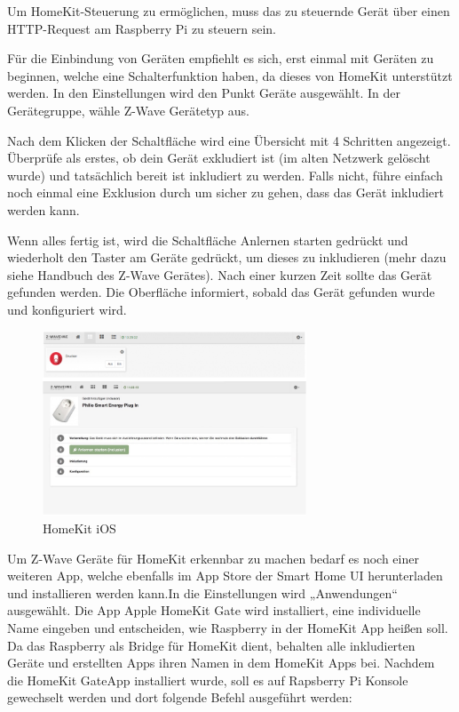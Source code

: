 Um HomeKit-Steuerung zu ermöglichen, muss das zu steuernde Gerät über einen HTTP-Request am Raspberry Pi zu steuern sein.

Für die Einbindung von Geräten empfiehlt es sich, erst einmal mit Geräten zu beginnen, welche eine Schalterfunktion haben, da dieses von HomeKit unterstützt werden. In den Einstellungen wird den Punkt \glqq Geräte\grqq{} ausgewählt. In der Gerätegruppe, wähle Z-Wave Gerätetyp aus.

Nach dem Klicken der Schaltfläche wird eine Übersicht mit 4 Schritten angezeigt. Überprüfe als
erstes, ob dein Gerät exkludiert ist (im alten Netzwerk gelöscht wurde) und tatsächlich bereit ist inkludiert zu werden. Falls nicht, führe einfach noch einmal eine Exklusion durch um sicher zu gehen, dass das Gerät inkludiert werden kann.

Wenn alles fertig ist, wird die Schaltfläche \glqq Anlernen starten\grqq{} gedrückt und wiederholt den Taster am Geräte gedrückt, um dieses zu inkludieren (mehr dazu siehe Handbuch des Z-Wave Gerätes). Nach einer kurzen Zeit sollte das Gerät gefunden werden. Die Oberfläche informiert, sobald das Gerät gefunden wurde und konfiguriert wird.

\begin{figure}[h!]
	\centering
	\includegraphics[width=0.7\textwidth]{img/Feedback-Mechanismen/HomeKit.png}
	\caption{HomeKit iOS}
	\label{fig:feedbackHomeKit}
\end{figure}

Um Z-Wave Geräte für HomeKit erkennbar zu machen bedarf es noch einer weiteren App, welche ebenfalls im App Store der Smart Home UI herunterladen und installieren werden kann.In die Einstellungen wird „Anwendungen“ ausgewählt. Die \glqq App Apple HomeKit Gate\grqq{} wird installiert, eine individuelle Name eingeben und entscheiden, wie Raspberry in der HomeKit App heißen soll. Da das Raspberry als Bridge für HomeKit dient, behalten alle inkludierten Geräte und erstellten Apps ihren Namen in dem HomeKit Apps bei. Nachdem die \glqq HomeKit Gate\grqq App installiert wurde, soll es auf Rapsberry Pi Konsole gewechselt werden und dort folgende Befehl ausgeführt werden:

